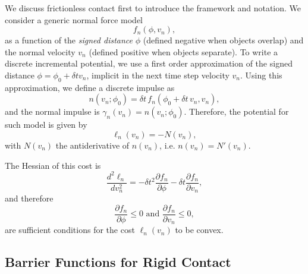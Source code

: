 We discuss frictionless contact first to introduce the framework and notation.
We consider a generic normal force model
\begin{equation}
    f_n(\phi, v_n),
    \label{eq:generic_force_law}
\end{equation}
as a function of the \emph{signed distance} $\phi$ (defined negative when
objects overlap) and the normal velocity $v_n$ (defined positive when objects
separate). To write a discrete incremental potential, we use a first order
approximation of the signed distance $\phi=\phi_0+\delta t v_n$, implicit in the
next time step velocity $v_n$. Using this approximation, we define a discrete
impulse as
\begin{equation}
    n(v_n; \phi_0) = \delta t\,f_n(\phi_0+\delta t\,v_n, v_n),
    \label{eq:discrete_normal_impulse}
\end{equation}
and the normal impulse is $\gamma_n(v_n)=n(v_n; \phi_0)$. Therefore, the
potential for such model is given by
\begin{equation*}
    \ell_n(v_n) = -N(v_n),
\end{equation*}
with $N(v_n)$ the antiderivative of $n(v_n)$, i.e. $n(v_n) = N'(v_n)$.

The Hessian of this cost is
\begin{equation*}
    \frac{d^2\ell_n}{dv_n^2} = -\delta t^2\frac{\partial f_n}{\partial\phi} - \delta t\frac{\partial f_n}{\partial v_n},
\end{equation*}
and therefore 
\begin{equation}
    \frac{\partial f_n}{\partial\phi}\le 0\text{ and }
    \frac{\partial f_n}{\partial v_n}\le 0,
    \label{eq:normal_sufficient_conditions}
\end{equation}
are sufficient conditions for the cost $\ell_n(v_n)$ to be convex.

\subsection{Barrier Functions for Rigid Contact}

